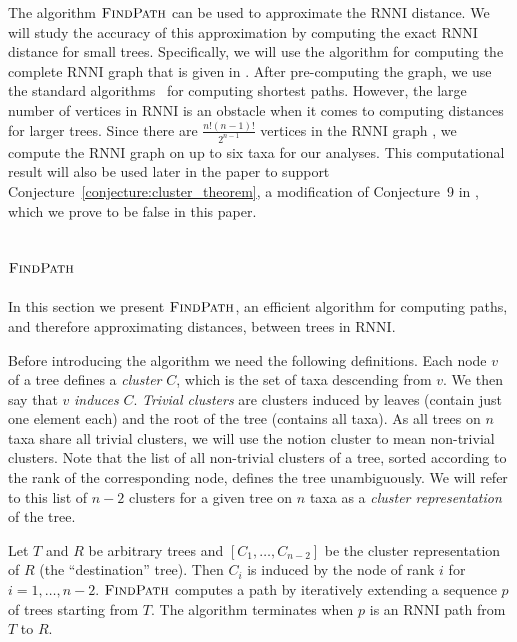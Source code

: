 \documentclass{amsart}
\newcommand{\rnni}{\mathrm{RNNI}}
\newcommand{\findpath}{\textsc{FindPath}}
\begin{document}
The algorithm $\findpath$ can be used to approximate the $\rnni$ distance.
We will study the accuracy of this approximation by computing the exact $\rnni$ distance for small trees.
Specifically, we will use the algorithm for computing the complete $\rnni$ graph that is given in \autocite[their Section 3.3]{Gavryushkin2018-ol}.
After pre-computing the graph, we use the standard algorithms~\autocite{Floyd1962-ew,Dijkstra1959-ph} for computing shortest paths.
However, the large number of vertices in $\rnni$ is an obstacle when it comes to computing distances for larger trees.
Since there are $\frac{n!(n-1)!}{2^{n-1}}$ vertices in the $\rnni$ graph \autocite{Gavryushkin2018-ol}, we compute the $\rnni$ graph on up to six taxa for our analyses.
This computational result will also be used later in the paper to support Conjecture~\ref{conjecture:cluster_theorem}, a modification of Conjecture~9 in \autocite{Gavryushkin2018-ol}, which we prove to be false in this paper.


\subsection{$\findpath$}
\label{section:alg_findpath}

In this section we present $\findpath$, an efficient algorithm for computing paths, and therefore approximating distances, between trees in $\rnni$.

Before introducing the algorithm we need the following definitions.
Each node $v$ of a tree defines a \emph{cluster} $C$, which is the set of taxa descending from $v$.
We then say that $v$ \emph{induces} $C$.
\emph{Trivial clusters} are clusters induced by leaves (contain just one element each) and the root of the tree (contains all taxa).
As all trees on $n$ taxa share all trivial clusters, we will use the notion cluster to mean non-trivial clusters.
Note that the list of all non-trivial clusters of a tree, sorted according to the rank of the corresponding node, defines the tree unambiguously.
We will refer to this list of $n-2$ clusters for a given tree on $n$ taxa as a \emph{cluster representation} of the tree.

Let $T$ and $R$ be arbitrary trees and $[C_1, \ldots, C_{n-2}]$ be the cluster representation of $R$ (the ``destination'' tree).
Then $C_i$ is induced by the node of rank $i$ for $i = 1, \ldots, n-2$.
$\findpath$ computes a path by iteratively extending a sequence $p$ of trees starting from $T$.
The algorithm terminates when $p$ is an $\rnni$ path from $T$ to $R$.
\end{document}
